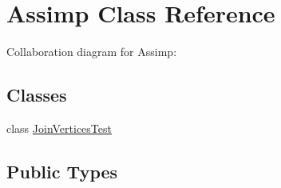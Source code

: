 \hypertarget{class_assimp}{\section{Assimp Class Reference}
\label{class_assimp}
}


Collaboration diagram for Assimp\+:
\subsection*{Classes}
\begin{DoxyCompactItemize}
\item 
class \hyperlink{class_assimp_1_1_join_vertices_test}{Join\+Vertices\+Test}
\end{DoxyCompactItemize}
\subsection*{Public Types}
